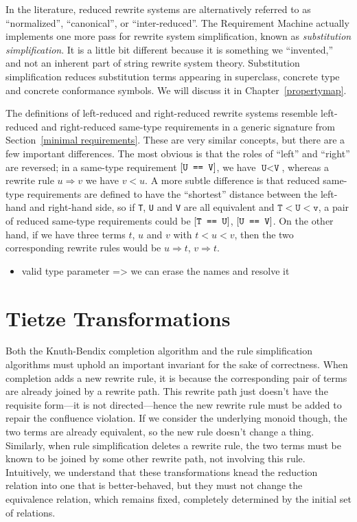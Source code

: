 \documentclass[../generics]{subfiles}
\begin{document}
In the literature, reduced rewrite systems are alternatively referred to as ``normalized'', ``canonical'', or ``inter-reduced''. The Requirement Machine actually implements one more pass for rewrite system simplification, known as \emph{substitution simplification}. It is a little bit different because it is something we ``invented,'' and not an inherent part of string rewrite system theory. Substitution simplification reduces substitution terms appearing in superclass, concrete type and concrete conformance symbols. We will discuss it in Chapter~\ref{propertymap}.

The definitions of left-reduced and right-reduced rewrite systems resemble left-reduced and right-reduced same-type requirements in a generic signature from Section~\ref{minimal requirements}. These are very similar concepts, but there are a few important differences. The most obvious is that the roles of ``left'' and ``right'' are reversed; in a same-type requirement $[\texttt{U == V}]$, we have $\texttt{U} < \texttt{V}$, whereas a rewrite rule $u\Rightarrow v$ we have $v<u$. A more subtle difference is that reduced same-type requirements are defined to have the ``shortest'' distance between the left-hand and right-hand side, so if \texttt{T}, \texttt{U} and \texttt{V} are all equivalent and $\texttt{T}<\texttt{U}<\texttt{v}$, a pair of reduced same-type requirements could be $[\texttt{T == U}]$, $[\texttt{U == V}]$. On the other hand, if we have three terms $t$, $u$ and $v$ with $t<u<v$, then the two corresponding rewrite rules would be $u\Rightarrow t$, $v\Rightarrow t$.

\begin{itemize}
\item valid type parameter => we can erase the names and resolve it
\end{itemize}

\section{Tietze Transformations}\label{tietze transformations}

Both the Knuth-Bendix completion algorithm and the rule simplification algorithms must uphold an important invariant for the sake of correctness. When completion adds a new rewrite rule, it is because the corresponding pair of terms are already joined by a rewrite path. This rewrite path just doesn't have the requisite form---it is not directed---hence the new rewrite rule must be added to repair the confluence violation. If we consider the underlying monoid though, the two terms are already equivalent, so the new rule doesn't change a thing. Similarly, when rule simplification deletes a rewrite rule, the two terms must be known to be joined by some other rewrite path, not involving this rule. Intuitively, we understand that these transformations knead the reduction relation into one that is better-behaved, but they must not change the equivalence relation, which remains fixed, completely determined by the initial set of relations.
\end{document}
